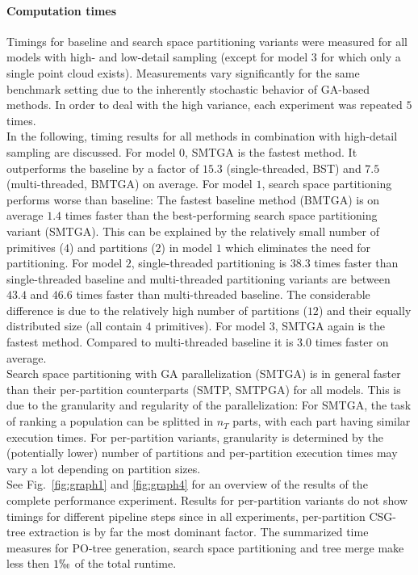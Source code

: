 \paragraph{Computation times}  
Timings for baseline and search space partitioning variants were measured for all models with high- and low-detail sampling (except for model $3$ for which only a single point cloud exists).
Measurements vary significantly for the same benchmark setting due to the inherently stochastic behavior of \ac{GA}-based methods. 
In order to deal with the high variance, each experiment was repeated $5$ times.
\\
In the following, timing results for all methods in combination with high-detail sampling are discussed.
For model $0$, SMTGA is the fastest method. 
It outperforms the baseline by a factor of $15.3$ (single-threaded, BST) and $7.5$ (multi-threaded, BMTGA) on average.
For model $1$, search space partitioning performs worse than baseline: 
The fastest baseline method (BMTGA) is on average $1.4$ times faster than the best-performing search space partitioning variant (SMTGA).
This can be explained by the relatively small number of primitives ($4$) and partitions ($2$) in model $1$ which eliminates the need for partitioning.
For model $2$, single-threaded partitioning is $38.3$ times faster than single-threaded baseline and multi-threaded partitioning variants are between $43.4$ and $46.6$ times faster than multi-threaded baseline.  
The considerable difference is due to the relatively high number of partitions ($12$) and their equally distributed size (all contain $4$ primitives).
For model $3$, SMTGA again is the fastest method. 
Compared to multi-threaded baseline it is $3.0$ times faster on average.
\\
Search space partitioning with \ac{GA} parallelization (SMTGA) is in general faster than their per-partition counterparts (SMTP, SMTPGA) for all models.
This is due to the granularity and regularity of the parallelization: 
For SMTGA, the task of ranking a population can be splitted in $n_T$ parts, with each part having similar execution times.
For per-partition variants, granularity is determined by the (potentially lower) number of partitions and per-partition execution times may vary a lot depending on partition sizes. 
\\
See Fig.~\ref{fig:graph1} and \ref{fig:graph4} for an overview of the results of the complete performance experiment.
Results for per-partition variants do not show timings for different pipeline steps since in all experiments, per-partition \ac{CSG}-tree extraction is by far the most dominant factor. 
The summarized time measures for \ac{PO}-tree generation, search space partitioning and tree merge make less then $1\permil$ of the total runtime.
